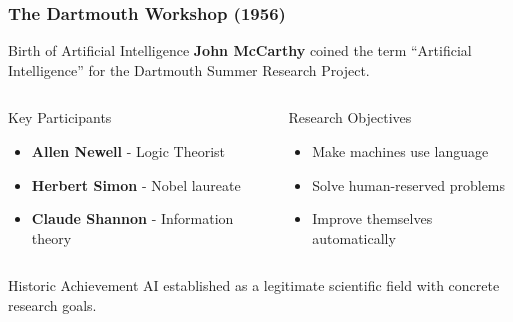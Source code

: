 \documentclass{beamer}
\begin{document}
\begin{frame}
    \frametitle{The Dartmouth Workshop (1956)}
    \begin{block}{Birth of Artificial Intelligence}
        \textbf{John McCarthy} coined the term ``Artificial Intelligence'' for the Dartmouth Summer Research Project.
    \end{block}
    
    \begin{columns}
        \begin{column}{0.48\textwidth}
            \begin{alertblock}{Key Participants}
                \begin{itemize}
                    \item \textbf{Allen Newell} - Logic Theorist
                    \item \textbf{Herbert Simon} - Nobel laureate
                    \item \textbf{Claude Shannon} - Information theory
                \end{itemize}
            \end{alertblock}
        \end{column}
        \begin{column}{0.48\textwidth}
            \begin{exampleblock}{Research Objectives}
                \begin{itemize}
                    \item Make machines use language
                    \item Solve human-reserved problems
                    \item Improve themselves automatically
                \end{itemize}
            \end{exampleblock}
        \end{column}
    \end{columns}
    
    \begin{block}{Historic Achievement}
        AI established as a legitimate scientific field with concrete research goals.
    \end{block}
\end{frame}
\end{document}
